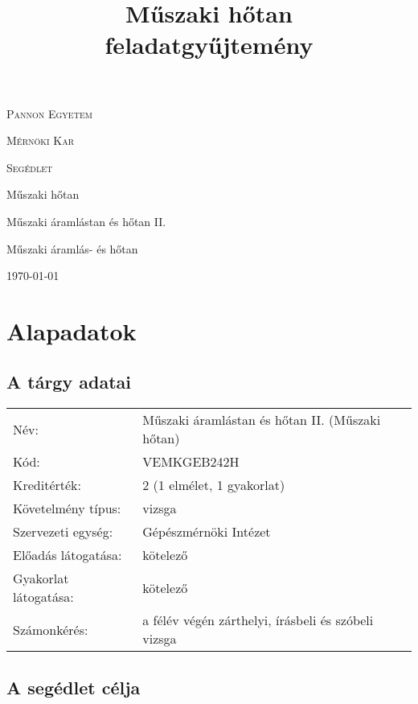 \documentclass[11pt, a4paper]{report}
\author{}
\title{Műszaki hőtan \\ feladatgyűjtemény}
\begin{document}
\begin{titlepage}
	\centering
	{\scshape\LARGE Pannon Egyetem \par}
	{\scshape\LARGE Mérnöki Kar \par}
	\vspace{1cm}
	{\scshape\Large Segédlet\par}
	\vspace{1.5cm}
	{\huge\bfseries{\JakiTitle} \par}
	\vspace{2cm}
	{\Large\itshape\JakiAuthor\par}
	\vfill
	Műszaki hőtan \par
	Műszaki áramlástan és hőtan II.\par
	Műszaki áramlás- és hőtan

	\vfill

	{\large \today\par}
\end{titlepage}

\tableofcontents


\chapter*{Alapadatok}

\section*{A tárgy adatai}

\begin{tabular}{ l l }
Név: & Műszaki áramlástan és hőtan II. (Műszaki hőtan) \\
Kód: & VEMKGEB242H \\
Kreditérték: & 2 (1 elmélet, 1 gyakorlat) \\
Követelmény típus: & vizsga \\
Szervezeti egység: & Gépészmérnöki Intézet \\
Előadás látogatása: & kötelező \\
Gyakorlat látogatása: & kötelező \\
Számonkérés: & a félév végén zárthelyi, írásbeli és szóbeli vizsga \\
\end{tabular}

\section*{A segédlet célja}
\end{document}
